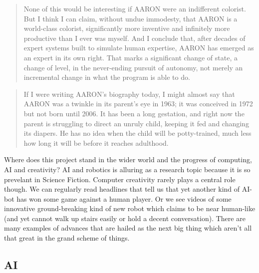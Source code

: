 \documentclass[11pt]{thesis} %
\begin{document}
\begin{quotation}
  None of this would be interesting if AARON were an indifferent colorist. But I think I can claim, without undue immodesty, that AARON is a world-class colorist, significantly more inventive and infinitely more productive than I ever was myself. And I conclude that, after decades of expert systems  built to simulate human expertise, AARON has emerged as an expert in its own right. That marks a significant change of state, a change of level, in the never-ending pursuit of autonomy, not merely an incremental change in what the program is able to do. 
\end{quotation}

\begin{quotation}
  If I were writing AARON's biography today, I might almost say that AARON was a twinkle in its parent's eye in 1963; it was conceived in 1972 but not born until 2006. It has been a long gestation, and right now the parent is struggling to direct an unruly child, keeping it fed and changing its diapers. He has no idea when the child will be potty-trained, much less how long it will be before it reaches adulthood.
\end{quotation}

\spirals


Where does this project stand in the wider world and the progress of computing, \ac{AI} and creativity? \ac{AI} and robotics is alluring as a research topic because it is so prevelant in Science Fiction. Computer creativity rarely plays a central role though. We can regularly read headlines that tell us that yet another kind of \ac{AI}-bot has won some game against a human player. Or we see videos of some innovative ground-breaking kind of new robot which claims to be near human-like (and yet cannot walk up stairs easily or hold a decent conversation). There are many examples of advances that are hailed as the next big thing which aren't all that great in the grand scheme of things. 

\subsection{AI}
\end{document}
